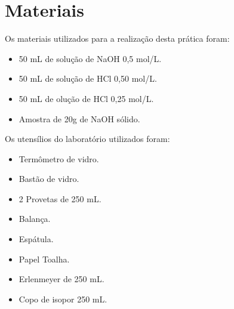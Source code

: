 
\section{Materiais}\label{sec:mat_materiais}
    \indent Os materiais utilizados para a realização desta prática foram:\
    
    \begin{itemize}
        \item 50 mL de solução de NaOH 0,5 mol/L.
        \item 50 mL de solução de HCl 0,50 mol/L.
        \item 50 mL de olução de HCl 0,25 mol/L.
        \item Amostra de 20g de NaOH sólido.
    \end{itemize}

    \indent Os utensílios do laboratório utilizados foram:\
    \begin{itemize}
        \item Termômetro de vidro.
        \item Bastão de vidro.
        \item 2 Provetas de 250 mL.
        \item Balança.
        \item Espátula.
        \item Papel Toalha.
        \item Erlenmeyer de 250 mL.
        \item Copo de isopor 250 mL.
    \end{itemize}\\